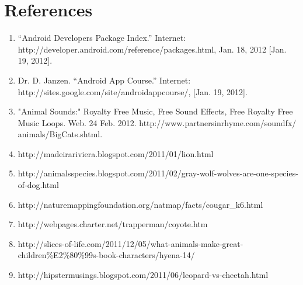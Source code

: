 \section{References}


\begin{enumerate}
	 
\item “Android Developers Package Index.” Internet: http://developer.android.com/reference/packages.html, Jan. 18, 2012 [Jan. 19, 2012].

\item Dr. D. Janzen. “Android App Course.” Internet: http://sites.google.com/site/androidappcourse/, [Jan. 19, 2012].

\item "Animal Sounds:" Royalty Free Music, Free Sound Effects, Free Royalty Free Music Loops. Web. 24 Feb. 2012. http://www.partnersinrhyme.com/soundfx/   animals/BigCats.shtml.

\item http://madeirariviera.blogspot.com/2011/01/lion.html

\item http://animalsspecies.blogspot.com/2011/02/gray-wolf-wolves-are-one-species-of-dog.html

\item http://naturemappingfoundation.org/natmap/facts/cougar\_k6.html

\item http://webpages.charter.net/trapperman/coyote.htm

\item http://slices-of-life.com/2011/12/05/what-animals-make-great-children\%E2\%80\%99s-book-characters/hyena-14/

\item http://hipstermusings.blogspot.com/2011/06/leopard-vs-cheetah.html

\end{enumerate}

